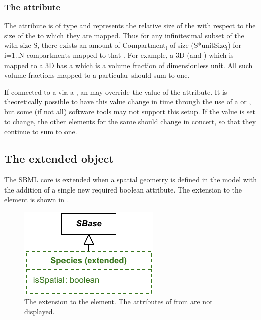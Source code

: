 \subsubsection{The  attribute}
The  attribute is of type  and represents the relative size of the \Compartment with respect to the size of the \Domains to which they are mapped.  Thus for any infinitesimal subset of the \Domain with size S, there exists an amount of Compartment$_{\text{i}}$ of size (S*unitSize$_{\text{i}}$) for i=1..N compartments mapped to that \DomainType.  For example, a 3D \Compartment (and \DomainType) which is mapped to a 3D \DomainType has a  which is a volume fraction of dimensionless unit.  All such volume fractions mapped to a particular \DomainType should sum to one. 

If connected to a \Parameter via a \SpatialSymbolReference, an \InitialAssignment may override the value of the  attribute.  It is theoretically possible to have this value change in time through the use of a \Rule or \Event, but some (if not all) software tools may not support this setup.  If the value is set to change, the other \CompartmentMapping elements for the same \DomainType should change in concert, so that they continue to sum to one.



\subsection{The extended \Species object}
\label{extended-species-class}
The SBML core \Species is extended when a spatial geometry is defined in the model with the addition of a single new required boolean  attribute.  The extension to the \Species element is shown in .
 
\begin{figure}[ht]
  \includegraphics{figs/extended-species-uml}
  \caption{The extension to the \Species element. The attributes of \Species from \sbmlthreecore are not displayed.}
  \label{species-uml}
\end{figure}



